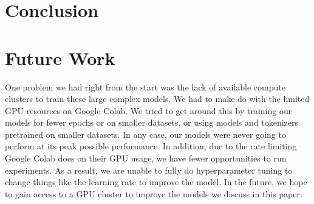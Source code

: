 \documentclass[11pt,a4paper]{article}
\begin{document}
\section{Conclusion}

\section{Future Work}
One problem we had right from the start was the lack of available compute clusters to train these large complex models. We had to make do with the limited GPU resources on Google Colab. We tried to get around this by training our models for fewer epochs or on smaller datasets, or using models and tokenizers pretrained on smaller datasets. In any case, our models were never going to perform at its peak possible performance. In addition, due to the rate limiting Google Colab does on their GPU usage, we have fewer opportunities to run experiments. As a result, we are unable to fully do hyperparameter tuning to change things like the learning rate to improve the model. In the future, we hope to gain access to a GPU cluster to improve the models we discuss in this paper.






\end{document}
